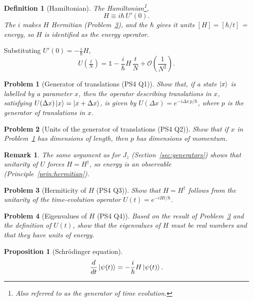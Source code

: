 \documentclass{article}
\newtheorem{definition}{Definition}
\newtheorem{problem}{Problem}
\newtheorem{remark}{Remark}
\newtheorem{proposition}{Proposition}
\newcommand{\id}{\mathds{1}}
\begin{document}
\begin{definition}[Hamiltonian]
    The Hamiltonian\footnote{Also referred to as the generator of time evolution.},
    \begin{equation}
        H \equiv i\hbar\,U'(0).
    \end{equation}
    The $i$ makes $H$ Hermitian (Problem~\ref{prob:H-herm}), and the $\hbar$ gives it units $[H] = [\hbar/t]$ = energy, so $H$ is identified as the energy operator.
\end{definition}
Substituting $U'(0) = -\frac{i}{\hbar}H$,
\begin{equation}
    \label{eq:UN-taylor}
    U\!\left(\tfrac{t}{N}\right) = \id - \frac{i}{\hbar}H\,\frac{t}{N} + \mathcal{O}\!\left(\frac{1}{N^2}\right).
\end{equation}
\begin{problem}[Generator of translations (PS4 Q1)]
    \label{prob:translation}
    Show that, if a state $\ket{x}$ is labelled by a parameter $x$, then the operator describing translations in $x$, satisfying $U(\Delta x)\ket{x} = \ket{x + \Delta x}$, is given by $U(\Delta x) = e^{-i\Delta x\,p/\hbar}$, where $p$ is the generator of translations in $x$.
\end{problem}
\begin{problem}[Units of the generator of translations (PS4 Q2)]
    Show that if $x$ in Problem~\ref{prob:translation} has dimensions of length, then $p$ has dimensions of momentum.
\end{problem}
\begin{remark}
    The same argument as for $J_z$ (Section~\ref{sec:generators}) shows that unitarity of $U$ forces $H = H^\dagger$, so energy is an observable (Principle~\ref{prin:hermitian}).
\end{remark}
\begin{problem}[Hermiticity of $H$ (PS4 Q3)]
    \label{prob:H-herm}
    Show that $H = H^\dagger$ follows from the unitarity of the time-evolution operator $U(t) = e^{-iHt/\hbar}$.
\end{problem}
\begin{problem}[Eigenvalues of $H$ (PS4 Q4)]
    Based on the result of Problem~\ref{prob:H-herm} and the definition of $U(t)$, show that the eigenvalues of $H$ must be real numbers and that they have units of energy.
\end{problem}
\begin{proposition}[Schr\"odinger equation]
    \begin{equation}
        \frac{d}{dt}\ket{\psi(t)} = -\frac{i}{\hbar}H\ket{\psi(t)}.
    \end{equation}
\end{proposition}
\end{document}
